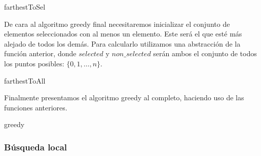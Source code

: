 \documentclass[11pt,a4paper]{article}
\begin{document}
	\begin{algorithm}[H]
		\caption{farthestToSel}
	\end{algorithm}
	
	De cara al algoritmo greedy final necesitaremos inicializar el conjunto de elementos seleccionados con al menos un elemento. Este será el que esté más alejado de todos los demás. Para calcularlo utilizamos una abstracción de la función anterior, donde $selected$ y $non\_selected$ serán ambos el conjunto de todos los puntos posibles: $\{0,1,\dotsc, n\}$. \\
	
	\begin{algorithm}[H]
		\caption{farthestToAll}
	\end{algorithm}

	Finalmente presentamos el algoritmo greedy al completo, haciendo uso de las funciones anteriores. \\

	\begin{algorithm}[H]
		\caption{greedy}
	\end{algorithm}

	\subsubsection{Búsqueda local}
	
\end{document}
